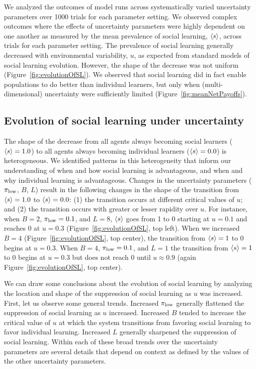 \documentclass[letterpaper,11.5pt]{scrartcl}
\begin{document}
We analyzed the outcomes of model runs across systematically varied uncertainty
parameters over 1000 trials for each parameter setting. 
We observed complex outcomes where the effects of uncertainty parameters
were highly dependent on one another as measured by the mean prevalence of
social learning, $\langle s \rangle$, across trials for each parameter setting. 
The prevalence of social learning
generally decreased with environmental variability, $u$, as expected from standard
models of social learning evolution. However, the shape of the decrease was not
uniform (Figure~\ref{fig:evolutionOfSL}). 
We observed that social learning did in fact enable populations to 
do better than individual learners, but only when (multi-dimensional) uncertainty 
were sufficiently limited (Figure~\ref{fig:meanNetPayoffs}).


\subsection{Evolution of social learning under uncertainty}
The shape of the decrease from all agents
always becoming social learners ($\langle s \rangle = 1.0$) to 
all agents always becoming individual learners ($\langle s \rangle = 0.0$)
is heterogeneous. We identified patterns in this heterogeneity that inform our
understanding of when and how social learning is advantageous, and when 
and why individual learning is advantageous. 
Changes in the uncertainty parameters ($\pi_{\mathrm{low}}$, $B$, $L$) 
result in the following changes in the shape of the transition from $\langle s \rangle = 1.0$ 
to $\langle s \rangle = 0.0$: (1) the transition
occurs at different critical values of $u$; and (2) the transition occurs
with greater or lesser rapidity over $u$. 
For instance, when $B=2$, $\pi_{\mathrm{low}} = 0.1$, and $L=8$, $\langle s \rangle$ goes from 1 to 
0 starting at $u=0.1$ and reaches 0 at $u=0.3$ (Figure~\ref{fig:evolutionOfSL},
top left). When we increased $B=4$ (Figure~\ref{fig:evolutionOfSL}, top center), the
transition from $\langle s \rangle = 1$ to 0 begins at $u=0.3$. When $B=4$, $\pi_{\mathrm{low}}=0.1$,
and $L=1$ the transition from $\langle s \rangle=1$ to 0 begins at $u=0.3$ but does not
reach 0 until $u \approx 0.9$ (again Figure~\ref{fig:evolutionOfSL}, top center).

We can draw some conclusions about the evolution of social learning by analyzing the
location and shape of the suppression of social learning as $u$ was increased.
First, let us observe some general trends. Increased $\pi_{\mathrm{low}}$ generally
flattened the suppression of social learning as $u$ increased.  
Increased $B$ tended to increase the critical value of $u$ at which the 
system transitions from favoring social learning to favor individual learning.  
Increased $L$ generally sharpened the suppression of social learning.
Within each of these broad trends over the uncertainty parameters are several
details that depend on context as defined by the values of the other uncertainty
parameters.
\end{document}
